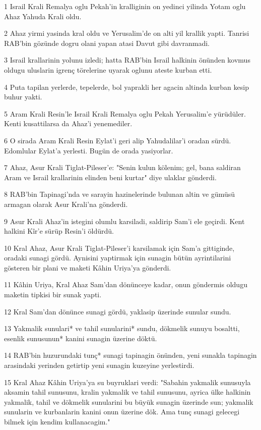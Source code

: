 \par 1 Israil Krali Remalya oglu Pekah'in kralliginin on yedinci yilinda Yotam oglu Ahaz Yahuda Krali oldu.
\par 2 Ahaz yirmi yasinda kral oldu ve Yerusalim'de on alti yil krallik yapti. Tanrisi RAB'bin gözünde dogru olani yapan atasi Davut gibi davranmadi.
\par 3 Israil krallarinin yolunu izledi; hatta RAB'bin Israil halkinin önünden kovmus oldugu uluslarin igrenç törelerine uyarak oglunu ateste kurban etti.
\par 4 Puta tapilan yerlerde, tepelerde, bol yaprakli her agacin altinda kurban kesip buhur yakti.
\par 5 Aram Krali Resin'le Israil Krali Remalya oglu Pekah Yerusalim'e yürüdüler. Kenti kusattilarsa da Ahaz'i yenemediler.
\par 6 O sirada Aram Krali Resin Eylat'i geri alip Yahudalilar'i oradan sürdü. Edomlular Eylat'a yerlesti. Bugün de orada yasiyorlar.
\par 7 Ahaz, Asur Krali Tiglat-Pileser'e: "Senin kulun kölenim; gel, bana saldiran Aram ve Israil krallarinin elinden beni kurtar" diye ulaklar gönderdi.
\par 8 RAB'bin Tapinagi'nda ve sarayin hazinelerinde bulunan altin ve gümüsü armagan olarak Asur Krali'na gönderdi.
\par 9 Asur Krali Ahaz'in istegini olumlu karsiladi, saldirip Sam'i ele geçirdi. Kent halkini Kîr'e sürüp Resin'i öldürdü.
\par 10 Kral Ahaz, Asur Krali Tiglat-Pileser'i karsilamak için Sam'a gittiginde, oradaki sunagi gördü. Aynisini yaptirmak için sunagin bütün ayrintilarini gösteren bir plani ve maketi Kâhin Uriya'ya gönderdi.
\par 11 Kâhin Uriya, Kral Ahaz Sam'dan dönünceye kadar, onun göndermis oldugu maketin tipkisi bir sunak yapti.
\par 12 Kral Sam'dan dönünce sunagi gördü, yaklasip üzerinde sunular sundu.
\par 13 Yakmalik sunulari* ve tahil sunularini* sundu, dökmelik sunuyu bosaltti, esenlik sunusunun* kanini sunagin üzerine döktü.
\par 14 RAB'bin huzurundaki tunç* sunagi tapinagin önünden, yeni sunakla tapinagin arasindaki yerinden getirtip yeni sunagin kuzeyine yerlestirdi.
\par 15 Kral Ahaz Kâhin Uriya'ya su buyruklari verdi: "Sabahin yakmalik sunusuyla aksamin tahil sunusunu, kralin yakmalik ve tahil sunusunu, ayrica ülke halkinin yakmalik, tahil ve dökmelik sunularini bu büyük sunagin üzerinde sun; yakmalik sunularin ve kurbanlarin kanini onun üzerine dök. Ama tunç sunagi gelecegi bilmek için kendim kullanacagim."
